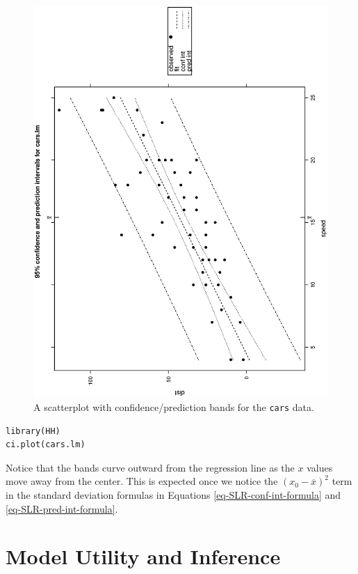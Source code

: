\documentclass[captions=tableheading]{scrbook}
\begin{document}
\begin{figure}[th]
  \includegraphics[angle=270, totalheight=4in]{ps/slr/carscipi.ps}
  \caption[Scatterplot with confidence/prediction bands for the \texttt{cars} data]{\small A scatterplot with confidence/prediction bands for the \texttt{cars} data.}
  \label{fig-Scatter-cars-CIPI}
\end{figure}



\lstset{language=R}
\begin{lstlisting}
library(HH)
ci.plot(cars.lm)
\end{lstlisting}

Notice that the bands curve outward from the regression line as the \(x\) values move away from the center. This is expected once we notice the \((x_{0}-\overline{x})^{2}\) term in the standard deviation formulas in Equations \ref{eq-SLR-conf-int-formula} and \ref{eq-SLR-pred-int-formula}.
\section{Model Utility and Inference}
\label{sec-11-3}
\label{sec-Model-Utility-SLR}
\end{document}
